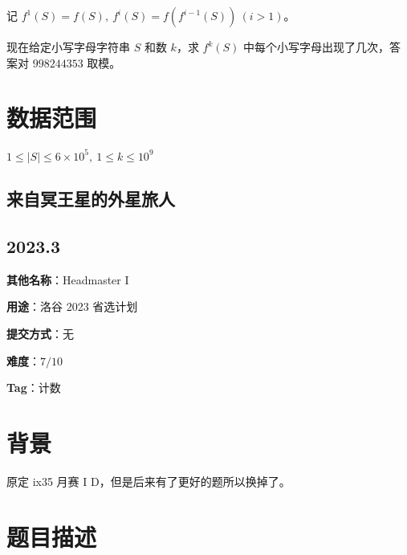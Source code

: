 \documentclass[a4paper,10pt]{article}
\begin{document}
记 $f^1(S)=f(S),\ f^i(S)=f(f^{i-1}(S))\ (i>1)$。

现在给定小写字母字符串 $S$ 和数 $k$，求 $f^k(S)$ 中每个小写字母出现了几次，答案对 $998244353$ 取模。

\section*{数据范围}

$1\leq |S|\leq 6\times 10^5,\ 1\leq k\leq 10^9$

\newpage

\vspace*{\fill}
\begin{center}

\section{来自冥王星的外星旅人}

\subsection*{2023.3}

\vspace{10pt}

\textbf{其他名称}：Headmaster I

\vspace{10pt}

\textbf{用途}：洛谷 2023 省选计划

\vspace{10pt}

\textbf{提交方式}：无

\vspace{10pt}

\textbf{难度}：$7/10$

\vspace{10pt}

\textbf{Tag}：计数

\end{center}
\vspace*{\fill}

\newpage

\section*{背景}

原定 ix35 月赛 I D，但是后来有了更好的题所以换掉了。

\section*{题目描述}
\end{document}
